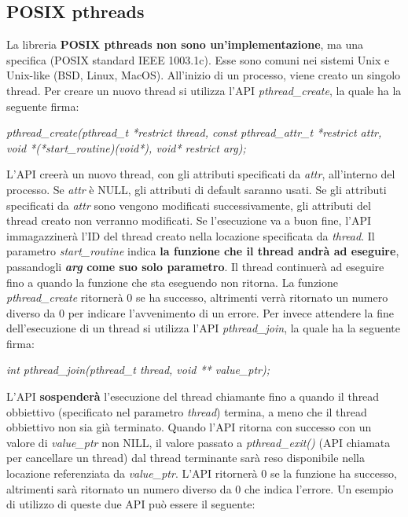 \documentclass[12pt]{article}
\begin{document}
\subsection{POSIX pthreads}
La libreria \textbf{POSIX pthreads non sono un'implementazione}, ma una specifica (POSIX standard IEEE 1003.1c).
Esse sono comuni nei sistemi Unix e Unix-like (BSD, Linux, MacOS).
All'inizio di un processo, viene creato un singolo thread.
Per creare un nuovo thread si utilizza l'API \textit{pthread\_create}, la quale ha la seguente firma:
\begin{center}
    \textit{pthread\_create(pthread\_t *restrict thread, const pthread\_attr\_t *restrict attr, void *(*start\_routine)(void*), void* restrict arg);}
\end{center}
L'API creerà un nuovo thread, con gli attributi specificati da \textit{attr}, all'interno del processo.
Se \textit{attr} è NULL, gli attributi di default saranno usati. Se gli attributi specificati da \textit{attr} sono vengono modificati successivamente, gli attributi
del thread creato non verranno modificati. Se l'esecuzione va a buon fine, l'API immagazzinerà l'ID del thread creato nella locazione specificata da \textit{thread}.
Il parametro \textit{start\_routine} indica \textbf{la funzione che il thread andrà ad eseguire}, passandogli \textbf{\textit{arg} come suo solo parametro}. Il thread continuerà ad eseguire fino a quando la funzione che sta eseguendo
non ritorna. La funzione \textit{pthread\_create} ritornerà 0 se ha successo, altrimenti verrà ritornato un numero diverso da 0 per indicare l'avvenimento di un errore.
Per invece attendere la fine dell'esecuzione di un thread si utilizza l'API \textit{pthread\_join}, la quale ha la seguente firma:
\begin{center}
    \textit{int pthread\_join(pthread\_t thread, void ** value\_ptr);}
\end{center}
L'API \textbf{sospenderà} l'esecuzione del thread chiamante fino a quando il thread obbiettivo (specificato nel parametro \textit{thread}) termina, a meno che il thread obbiettivo non sia già terminato.
Quando l'API ritorna con successo con un valore di \textit{value\_ptr} non NILL, il valore passato a \textit{pthread\_exit()} (API chiamata per cancellare un thread) dal thread terminante sarà reso disponibile
nella locazione referenziata da \textit{value\_ptr}.
L'API ritornerà 0 se la funzione ha successo, altrimenti sarà ritornato un numero diverso da 0 che indica l'errore.
Un esempio di utilizzo di queste due API può essere il seguente:
\end{document}
